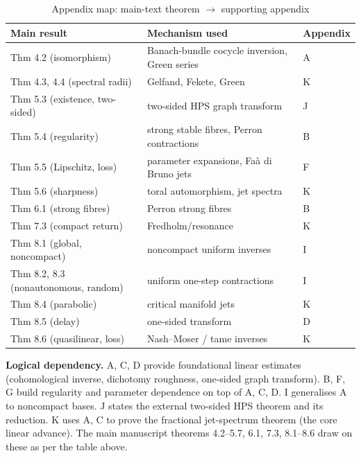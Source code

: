 \documentclass[12pt,a4paper]{article}
\theoremstyle{plain}
\numberwithin{equation}{section}
\numberwithin{theorem}{section}
\begin{document}
\begin{table}[h]
\centering
\caption{Appendix map: main-text theorem $\to$ supporting appendix}
\label{tab:supp-map-tex}
\begin{tabular}{@{}lll@{}}
\toprule
\textbf{Main result} & \textbf{Mechanism used} & \textbf{Appendix} \\
\midrule
Thm 4.2 (isomorphism) & Banach-bundle cocycle inversion, Green series & A \\
Thm 4.3, 4.4 (spectral radii) & Gelfand, Fekete, Green & K \\
Thm 5.3 (existence, two-sided) & two-sided HPS graph transform & J \\
Thm 5.4 (regularity) & strong stable fibres, Perron contractions & B \\
Thm 5.5 (Lipschitz, loss) & parameter expansions, Fa\`a di Bruno jets & F \\
Thm 5.6 (sharpness) & toral automorphism, jet spectra & K \\
Thm 6.1 (strong fibres) & Perron strong fibres & B \\
Thm 7.3 (compact return) & Fredholm/resonance & K \\
Thm 8.1 (global, noncompact) & noncompact uniform inverses & I \\
Thm 8.2, 8.3 (nonautonomous, random) & uniform one-step contractions & I \\
Thm 8.4 (parabolic) & critical manifold jets & K \\
Thm 8.5 (delay) & one-sided transform & D \\
Thm 8.6 (quasilinear, loss) & Nash--Moser / tame inverses & K \\
\bottomrule
\end{tabular}
\end{table}

\vspace{1em}

\noindent
\textbf{Logical dependency.} 
A, C, D provide foundational linear estimates (cohomological inverse, dichotomy roughness, one-sided graph transform).
B, F, G build regularity and parameter dependence on top of A, C, D.
I generalises A to noncompact bases.
J states the external two-sided HPS theorem and its reduction.
K uses A, C to prove the fractional jet-spectrum theorem (the core linear advance).
The main manuscript theorems 4.2--5.7, 6.1, 7.3, 8.1--8.6 draw on these as per the table above.


\end{document}
